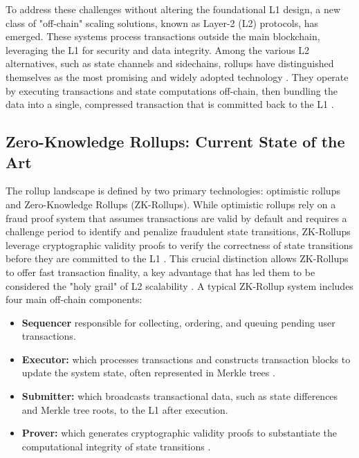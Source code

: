 To address these challenges without altering the foundational L1 design, a new class of "off-chain" scaling solutions, known as Layer-2 (L2) protocols, has emerged. These systems process transactions outside the main blockchain, leveraging the L1 for security and data integrity. Among the various L2 alternatives, such as state channels and sidechains, rollups have distinguished themselves as the most promising and widely adopted technology \cite{saif2024survey, habib2025analyzing, ethScalingDocs}. They operate by executing transactions and state computations off-chain, then bundling the data into a single, compressed transaction that is committed back to the L1 \cite{silva2025public}.

\vspace{12pt}
\subsection{Zero-Knowledge Rollups: Current State of the Art}
\vspace{12pt}

The rollup landscape is defined by two primary technologies: optimistic rollups and Zero-Knowledge Rollups (ZK-Rollups). While optimistic rollups rely on a fraud proof system that assumes transactions are valid by default and requires a challenge period to identify and penalize fraudulent state transitions, ZK-Rollups leverage cryptographic validity proofs to verify the correctness of state transitions before they are committed to the L1 \cite{motepalli2023sok}. This crucial distinction allows ZK-Rollups to offer fast transaction finality, a key advantage that has led them to be considered the "holy grail" of L2 scalability \cite{chaliasos2024pricing}.
A typical ZK-Rollup system includes four main off-chain components:
\vspace{12pt}
\begin{itemize}
    \item \textbf{Sequencer} responsible for collecting, ordering, and queuing pending user transactions.
    \item \textbf{Executor:} which processes transactions and constructs transaction blocks to update the system state, often represented in Merkle trees \cite{saez2022overview}.
    \item \textbf{Submitter:} which broadcasts transactional data, such as state differences and Merkle tree roots, to the L1 after execution.
    \item \textbf{Prover:} which generates cryptographic validity proofs to substantiate the computational integrity of state transitions \cite{motepalli2023sok}.
\end{itemize}

